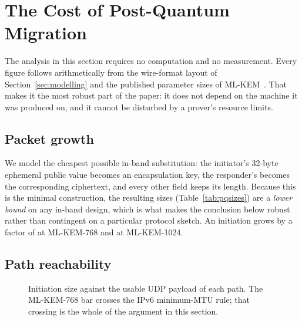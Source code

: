 \section{The Cost of Post-Quantum Migration}
\label{sec:pq}

The analysis in this section requires no computation and no measurement. Every
figure follows arithmetically from the wire-format layout of
Section~\ref{sec:modelling} and the published parameter sizes of
ML-KEM~\cite{fips203}. That makes it the most robust part of the paper: it
does not depend on the machine it was produced on, and it cannot be disturbed
by a prover's resource limits.

\subsection{Packet growth}

\begin{table}[t]
\centering
\caption{In-band KEM substitution, sizes in bytes. The substitution modelled
is the cheapest one possible, so these are a lower bound on any in-band
design.}
\label{tab:pqsizes}
\footnotesize

\end{table}

We model the cheapest possible in-band substitution: the initiator's 32-byte
ephemeral public value becomes an encapsulation key, the responder's becomes
the corresponding ciphertext, and every other field keeps its length. Because
this is the minimal construction, the resulting sizes
(Table~\ref{tab:pqsizes}) are a \emph{lower bound} on any in-band design,
which is what makes the conclusion below robust rather than contingent on a
particular protocol sketch. An initiation grows by a factor of \wgKemGrowth{}
at ML-KEM-768 and \wgKemTenGrowth{} at ML-KEM-1024.

\subsection{Path reachability}

\begin{figure}[t]
\centering
\resizebox{\columnwidth}{!}{}
\caption{Initiation size against the usable UDP payload of each path. The
ML-KEM-768 bar crosses the IPv6 minimum-MTU rule; that crossing is the whole
of the argument in this section.}
\label{fig:mtu}
\end{figure}

\begin{table}[t]
\centering
\caption{ML-KEM-768 initiation against \wgPaths{} representative path MTUs.
Only the first row is a guarantee; the others are common cases.}
\label{tab:pqmtu}
\footnotesize

\end{table}

